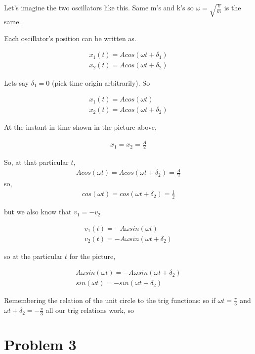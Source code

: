 \documentclass[10pt]{article}
\newcommand{\boxeq}[1]{%
  \begin{center}%
    \boxed{#1}%
  \end{center}%
}
\begin{document}
Let's imagine the two oscillators like this. Same m's and k's so
$\omega=\sqrt{\frac{k}{m}}$ is the same.

Each oscillator's position can be written as.

\begin{align*}
  x_1(t)=Acos(\omega t+\delta_1)\\
  x_2(t)=Acos(\omega t+\delta_2)
\end{align*}

Lets say $\delta_1 = 0$ (pick time origin arbitrarily). So

\begin{align*}
  x_1(t) = Acos(\omega t)\\
  x_2(t) = Acos(\omega t + \delta_2)
\end{align*}

At the instant in time shown in the picture above,

\begin{align*}
  x_1=x_2=\frac{A}{2}
\end{align*}

So, at that particular $t$,
\begin{align*}
  Acos(\omega t) = Acos(\omega t+\delta_2)=\frac{A}{2}
\end{align*}
so,
\begin{align*}
  cos(\omega t) = cos(\omega t + \delta_2)=\frac{1}{2}
\end{align*}

but we also know that $v_1=-v_2$

\begin{align*}
  v_1(t) = -A\omega sin(\omega t)\\
  v_2(t) = -A\omega sin(\omega t + \delta_2)
\end{align*}

so at the particular $t$ for the picture,

\begin{align*}
  A\omega sin(\omega t) = -A\omega sin(\omega t+\delta_2)\\
  sin(\omega t) = -sin(\omega t+\delta_2)
\end{align*}

Remembering the relation of the unit circle to the trig functions:
so if $\omega t = \frac{\pi}{3}$ and $\omega t+\delta_2 = -\frac{\pi}{3}$ all
our trig relations work, so

\boxeq{\delta_2=-\frac{2\pi}{3}}

\section*{Problem 3}
\label{sec:problem_3}
\end{document}

